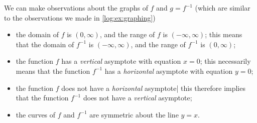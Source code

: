 \begin{pccexample}
\begin{pccsolution}
		We can make observations about the graphs of $f$ and $g=f^{-1}$ (which are 
		similar to the observations we made in \vref{log:ex:graphing})
		\begin{itemize}
			\item the domain of $f$ is $(0,\infty)$, and the range of $f$ is $(-\infty,\infty)$; this means
			that the domain of $f^{-1}$ is $(-\infty,\infty)$, and the range of $f^{-1}$ is $(0,\infty)$;
			\item the function $f$ has a \emph{vertical} asymptote with equation $x=0$; this necessarily
			means that the function $f^{-1}$ has a \emph{horizontal} asymptote with equation $y=0$;
			\item the function $f$ does not have a \emph{horizontal} asymptote| this therefore
			implies that the function $f^{-1}$ does not have a \emph{vertical} asymptote;
			\item the curves of $f$ and $f^{-1}$ are symmetric about the line $y=x$.
		\end{itemize}
	\end{pccsolution}
\end{pccexample}

